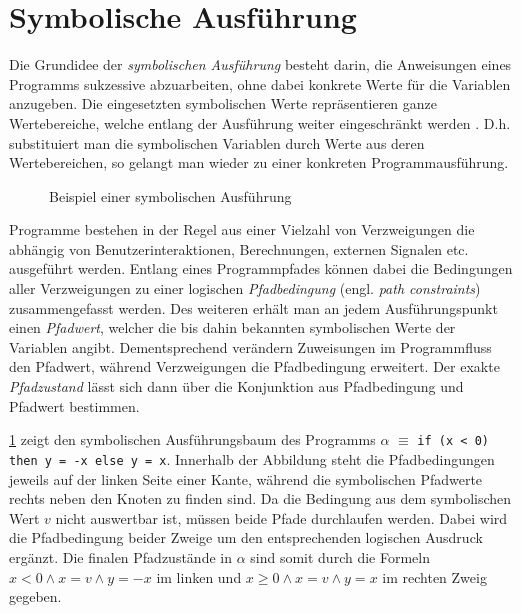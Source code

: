 \section{Symbolische Ausführung}

Die Grundidee der \emph{symbolischen Ausführung} besteht darin, die Anweisungen eines Programms sukzessive abzuarbeiten, ohne dabei konkrete Werte für die Variablen anzugeben. Die eingesetzten symbolischen Werte repräsentieren ganze Wertebereiche, welche entlang der Ausführung weiter eingeschränkt werden \cite{Kneuper2008}. D.h. substituiert man die symbolischen Variablen durch Werte aus deren Wertebereichen, so gelangt man wieder zu einer konkreten Programmausführung.

\begin{figure}[t]
	\centering
	
	\caption{Beispiel einer symbolischen Ausführung}
	\label{fig:tree}
\end{figure}

Programme bestehen in der Regel aus einer Vielzahl von Verzweigungen die abhängig von Benutzerinteraktionen, Berechnungen, externen Signalen etc. ausgeführt werden. Entlang eines Programmpfades können dabei die Bedingungen aller Verzweigungen zu einer logischen \emph{Pfadbedingung} (engl. \emph{path constraints}) zusammengefasst werden. Des weiteren erhält man an jedem Ausführungspunkt einen \emph{Pfadwert}, welcher die bis dahin bekannten symbolischen Werte der Variablen angibt. Dementsprechend verändern Zuweisungen im Programmfluss den Pfadwert, während Verzweigungen die Pfadbedingung erweitert. Der exakte \emph{Pfadzustand} lässt sich dann über die Konjunktion aus Pfadbedingung und Pfadwert bestimmen.

\cref{fig:tree} zeigt den symbolischen Ausführungsbaum des Programms $\alpha$ $\equiv$ \texttt{if (x < 0) then y = -x else y = x}. Innerhalb der Abbildung steht die Pfadbedingungen jeweils auf der linken Seite einer Kante, während die symbolischen Pfadwerte rechts neben den Knoten zu finden sind. Da die Bedingung aus dem symbolischen Wert $v$ nicht auswertbar ist, müssen beide Pfade durchlaufen werden. Dabei wird die Pfadbedingung beider Zweige um den entsprechenden logischen Ausdruck ergänzt. Die finalen Pfadzustände in $\alpha$ sind somit durch die Formeln $x < 0 \wedge x = v \wedge y = -x$ im linken und $x \geq 0 \wedge x = v \wedge y = x$ im rechten Zweig gegeben.

